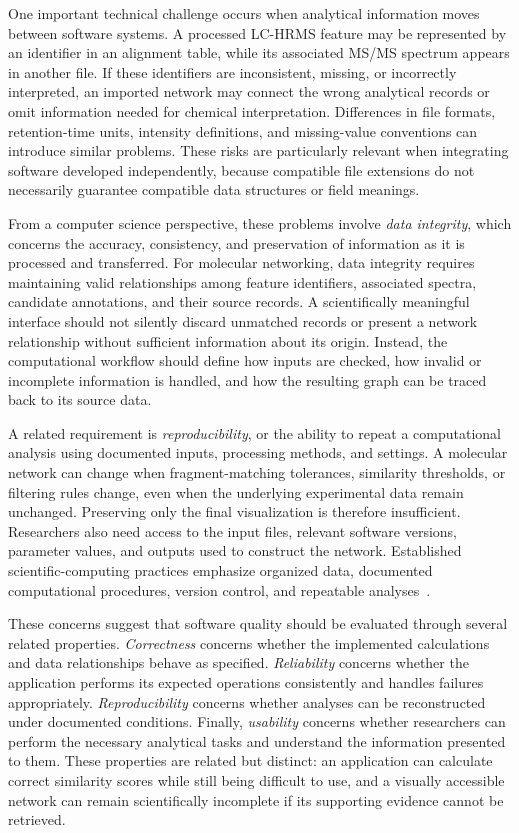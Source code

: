         One important technical challenge occurs when analytical information moves between software systems. A processed LC-HRMS feature may be represented by an identifier in an alignment table, while its associated MS/MS spectrum appears in another file. If these identifiers are inconsistent, missing, or incorrectly interpreted, an imported network may connect the wrong analytical records or omit information needed for chemical interpretation. Differences in file formats, retention-time units, intensity definitions, and missing-value conventions can introduce similar problems. These risks are particularly relevant when integrating software developed independently, because compatible file extensions do not necessarily guarantee compatible data structures or field meanings.

        From a computer science perspective, these problems involve \emph{data integrity}, which concerns the accuracy, consistency, and preservation of information as it is processed and transferred. For molecular networking, data integrity requires maintaining valid relationships among feature identifiers, associated spectra, candidate annotations, and their source records. A scientifically meaningful interface should not silently discard unmatched records or present a network relationship without sufficient information about its origin. Instead, the computational workflow should define how inputs are checked, how invalid or incomplete information is handled, and how the resulting graph can be traced back to its source data.

        A related requirement is \emph{reproducibility}, or the ability to repeat a computational analysis using documented inputs, processing methods, and settings. A molecular network can change when fragment-matching tolerances, similarity thresholds, or filtering rules change, even when the underlying experimental data remain unchanged. Preserving only the final visualization is therefore insufficient. Researchers also need access to the input files, relevant software versions, parameter values, and outputs used to construct the network. Established scientific-computing practices emphasize organized data, documented computational procedures, version control, and repeatable analyses~\cite{Wilson2017}.

        These concerns suggest that software quality should be evaluated through several related properties. \emph{Correctness} concerns whether the implemented calculations and data relationships behave as specified. \emph{Reliability} concerns whether the application performs its expected operations consistently and handles failures appropriately. \emph{Reproducibility} concerns whether analyses can be reconstructed under documented conditions. Finally, \emph{usability} concerns whether researchers can perform the necessary analytical tasks and understand the information presented to them. These properties are related but distinct: an application can calculate correct similarity scores while still being difficult to use, and a visually accessible network can remain scientifically incomplete if its supporting evidence cannot be retrieved.

